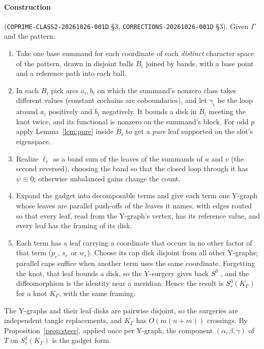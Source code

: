 \documentclass[11pt]{article}
\theoremstyle{definition}
\theoremstyle{remark}
\begin{document}
\paragraph{Construction} (\texttt{COPRIME-CLASS2-20261026-001D} \S3,
\texttt{CORRECTIONS-20261026-001D} \S3). Given $\Gamma$ and the pattern:
\begin{enumerate}
\item Take one base summand for each coordinate of each \emph{distinct}
character space of the pattern, drawn in disjoint balls $B_i$ joined by bands,
with a base point and a reference path into each ball.
\item In each $B_i$ pick arcs $a_i,b_i$ on which the summand's nonzero class
takes different values (constant cochains are coboundaries), and let
$\gamma_i$ be the loop around $a_i$ positively and $b_i$ negatively. It bounds
a disk in $B_i$ meeting the knot twice, and its functional is nonzero on the
summand's block. For odd $p$ apply Lemma~\ref{lem:pure} inside $B_i$ to get a
\emph{pure} leaf supported on the slot's eigenspace.
\item Realize $\ell_e$ as a band sum of the leaves of the summands of $u$ and
$v$ (the second reversed), choosing the band so that the closed loop through
it has $\psi\equiv0$; otherwise unbalanced gains change the count.
\item Expand the gadget into decomposable terms and give each term one
Y-graph whose leaves are parallel push-offs of the leaves it names, with edges
routed so that every leaf, read from the Y-graph's vertex, has its reference
value, and every leaf has the framing of its disk.
\item Each term has a leaf carrying a coordinate that occurs in no other
factor of that term ($p_e$, $s_e$ or $w_e$). Choose its cap disk disjoint from
all other Y-graphs; parallel caps suffice when another term uses the same
coordinate. Forgetting the knot, that leaf bounds a disk, so the Y-surgery
gives back $S^3$ \cite[Props.~3.3--3.4]{Hab00}, and the diffeomorphism is the
identity near a meridian. Hence the result is $S^3_r(K_\Gamma)$ for a knot
$K_\Gamma$, with the same framing.
\end{enumerate}
The Y-graphs and their leaf disks are pairwise disjoint, so the surgeries are
independent tangle replacements, and $K_\Gamma$ has $O(m(n+m))$ crossings.
By Proposition~\ref{prop:steer}, applied once per Y-graph, the component
$(\alpha,\beta,\gamma)$ of $T$ on $S^3_r(K_\Gamma)$ is the gadget form.
\end{document}

